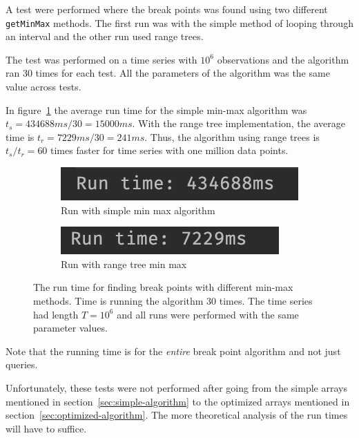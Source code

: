 A test were performed where the break points was found using two different
\texttt{getMinMax} methods. The first run was with the simple method of looping
through an interval and the other run used range trees. 

The test was performed on a time series with $10^6$ observations and the
algorithm ran 30 times for each test. All the parameters of the algorithm was
the same value across tests.

In figure~\ref{fig:run-simple} the average run time for the simple min-max
algorithm was $t_s = 434688 ms / 30 = 15000 ms$. With the range tree
implementation, the average time is $t_r = 7229 ms / 30 = 241 ms$. Thus, the
algorithm using range trees is $t_s / t_r = 60$ times faster for time series
with one million data points. 

\begin{figure}[ht]
    \centering
    \begin{subfigure}[b]{.48\textwidth}
        \centering
        \includegraphics[width=\textwidth]{fig/run-simple.png}
        \caption{Run with simple min max algorithm}
        \label{fig:run-simple}
    \end{subfigure}
    \hfill
    \begin{subfigure}[b]{.48\textwidth}
        \centering
        \includegraphics[width=\textwidth]{fig/run-range-tree.png}
        \caption{Run with range tree min max}
        \label{fig:run-range-tree}
    \end{subfigure}
    \caption{The run time for finding break points with different min-max methods. Time is running the algorithm 30 times. The time series had length $T = 10^6$ and all runs were performed with the same parameter values.}
    \label{fig:run-times}
\end{figure}

Note that the running time is for the \textit{entire} break point algorithm and
not just queries. 

Unfortunately, these tests  were not performed after going from the simple
arrays mentioned in section~\ref{sec:simple-algorithm} to the optimized arrays
mentioned in section~\ref{sec:optimized-algorithm}. The more theoretical
analysis of the run times will have to suffice. 

